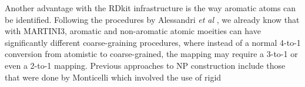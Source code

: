 \documentclass[12pt]{article}
\begin{document}
\newline
\newline
Another advantage with the RDkit infrastructure is the way aromatic atoms can be identified. Following the procedures by Alessandri \emph{et al} \cite{SmallMolecules}, we already know that with MARTINI3, aromatic and non-aromatic atomic moeities can have significantly different coarse-graining procedures, where instead of a normal 4-to-1 conversion from atomistic to coarse-grained, the mapping may require a 3-to-1 or even a 2-to-1 mapping. Previous approaches to NP construction include those that were done by Monticelli \cite{Fullerene} which involved the use of rigid  
\newline
\newline
\newline
\newline
\end{document}
